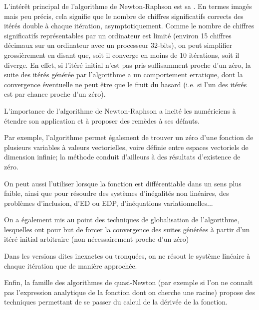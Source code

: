 \medskip
L'intérêt principal de l'algorithme de 
Newton-Raphson 
est sa . 
En termes imagés mais peu précis, cela signifie que le nombre de chiffres significatifs corrects des 
itérés double à chaque itération, asymptotiquement. 
Comme le nombre de chiffres significatifs représentables par un ordinateur est limité (environ 15 
chiffres décimaux sur un ordinateur avec un processeur 32-bits), on peut simplifier grossièrement 
en disant que, soit il converge en moins de 10 itérations, soit il diverge. 
En effet, si l'itéré initial n'est pas pris suffisamment proche d'un zéro, la suite des itérés 
générée par l'algorithme a un comportement erratique, dont la convergence éventuelle ne peut 
être que le fruit du hasard (i.e. si l'un des itérés est par chance proche d'un zéro).

\medskip
L'importance de l'algorithme de Newton-Raphson 
a incité les numériciens à étendre son application et à proposer 
des remèdes à ses défauts. 

Par exemple, l'algorithme permet également de trouver un zéro d'une fonction de plusieurs variables 
à valeurs vectorielles, voire définie entre espaces vectoriels de dimension infinie; 
la méthode conduit d'ailleurs à des résultats d'existence de zéro. 

On peut aussi l'utiliser lorsque la fonction est différentiable dans un sens plus faible, ainsi que pour 
résoudre des systèmes d'inégalités non linéaires, des problèmes d'inclusion, d'ED ou EDP,
d'inéquations variationnelles...

On a également mis au point des techniques de globalisation de l'algorithme, lesquelles ont pour but de 
forcer la convergence des suites générées à partir d'un itéré initial arbitraire (non nécessairement 
proche d'un zéro)

Dans les versions dites inexactes ou tronquées, on ne résout le système linéaire à chaque itération 
que de manière approchée. 

Enfin, la famille des algorithmes de quasi-Newton (par exemple si l'on ne connaît pas l'expression
analytique de la fonction dont on cherche une racine) propose des techniques permettant de se passer 
du calcul de la dérivée de la fonction. 

